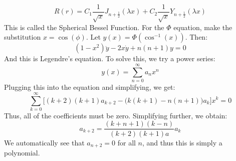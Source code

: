             \begin{equation}
                R(r)=C_{1}\frac{1}{\sqrt{x}}J_{n+\frac{1}{2}}(
                    \lambda{x})+C_{2}\frac{1}{\sqrt{x}}
                    Y_{n+\frac{1}{2}}(\lambda{x})
            \end{equation}
            This is called the Spherical Bessel Function. For the
            $\Phi$ equation, make the substitution $x=\cos(\phi)$.
            Let $y(x)=\Phi(\cos^{\minus{1}}(x))$. Then:
            \begin{equation}
                (1-x^{2})\ddot{y}-2x\dot{y}+n(n+1)y=0
            \end{equation}
            And this is Legendre's equation. To solve this, we try
            a power series:
            \begin{equation}
                y(x)=\sum_{n=0}^{\infty}a_{n}x^{n}
            \end{equation}
            Plugging this into the equation and simplifying,
            we get:
            \begin{equation}
                \sum_{k=0}^{\infty}\Big[
                    (k+2)(k+1)a_{k+2}-\big(k(k+1)-n(n+1)\big)a_{k}
                    \Big]x^{k}=0
            \end{equation}
            Thus, all of the coefficients must be zero. Simplifying
            further, we obtain:
            \begin{equation}
                a_{k+2}=\frac{(k+n+1)(k-n)}{(k+2)(k+1)a}a_{k}
            \end{equation}
            We automatically see that $a_{n+2}=0$ for all $n$, and
            thus this is simply a polynomial.
